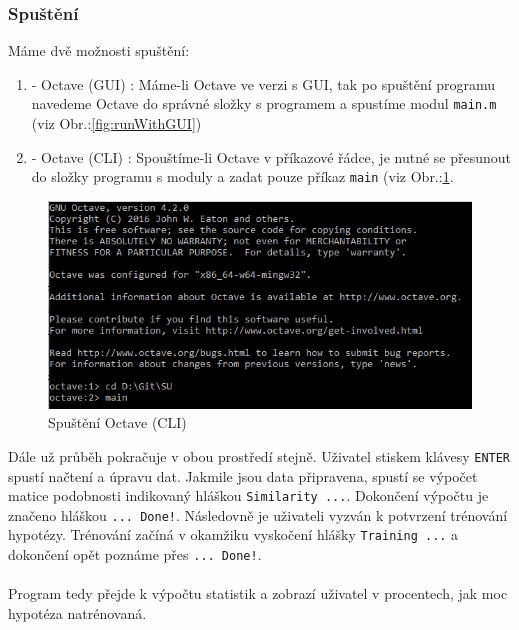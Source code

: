 \documentclass[a4]{article}
\begin{document}
\subsubsection{Spuštění}
Máme dvě možnosti spuštění:

\begin{enumerate}
	\item - Octave (GUI) : Máme-li Octave ve verzi s GUI, tak po spuštění programu navedeme Octave do správné složky s programem a spustíme modul \texttt{main.m} (viz Obr.:\ref{fig:runWithGUI})
	\item - Octave (CLI) : Spouštíme-li Octave v příkazové řádce, je nutné se přesunout do složky programu s moduly a zadat pouze příkaz \texttt{main} (viz Obr.:\ref{fig:runWithoutGUI}.
\end{enumerate}

\begin{figure}[!ht]
	\centering
		\includegraphics[width=\textwidth]{images/runWithoutGUI}
	\caption{Spuštění Octave (CLI)}
	\label{fig:runWithoutGUI}
\end{figure}

\noindent Dále už průběh pokračuje v obou prostředí stejně. Uživatel stiskem klávesy \texttt{ENTER} spustí načtení a úpravu dat. Jakmile jsou data připravena, spustí se výpočet matice podobnosti indikovaný hláškou \texttt{Similarity ...}. Dokončení výpočtu je značeno hláškou \texttt{... Done!}. Následovně je uživateli vyzván k potvrzení trénování hypotézy. Trénování začíná v okamžiku vyskočení hlášky \texttt{Training ...} a dokončení opět poznáme přes \texttt{... Done!}.
\\\\
Program tedy přejde k výpočtu statistik a zobrazí uživatel v procentech, jak moc hypotéza natrénovaná.
\end{document}
